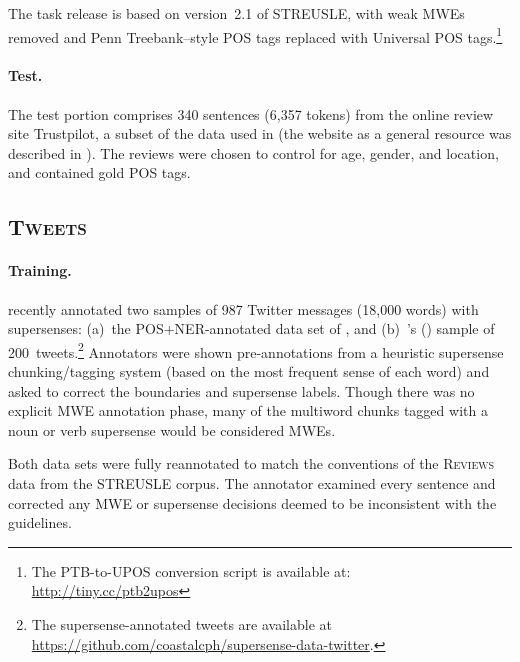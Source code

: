 \documentclass[11pt,letterpaper]{article}
\newcommand{\citeposs}[1]{\citeauthor{#1}'s (\citeyear{#1})}
\newcommand{\ensuretext}[1]{#1}
\newcommand{\nssmarker}{\ensuretext{\textcolor{magenta}{\ensuremath{^{\textsc{NS}}_{\textsc{S}}}}}}
\newcommand{\arkcomment}[3]{\ensuretext{\textcolor{#3}{[#1 #2]}}}
\newcommand{\nss}[1]{\arkcomment{\nssmarker}{#1}{magenta}}
\newcommand{\dataset}[1]{\mbox{\textsc{#1}}}	%
\newcommand{\finalversion}[1]{}
\newcommand{\longversion}[1]{#1} %
\begin{document}
The task release is based on version~2.1 of STREUSLE, with weak MWEs removed
and Penn Treebank--style POS tags replaced with Universal POS tags.\footnote{The PTB-to-UPOS conversion script is available at:
\mbox{\url{http://tiny.cc/ptb2upos}}} 


\paragraph{Test.}
The test portion comprises 340 sentences (6,357 tokens) from the online review site Trustpilot, a subset of the data used in \citet{hovy-2015age} 
(the website as a general resource was described in \citet{hovy-2015trustpilot}). 
The reviews were chosen to control for age, gender, and location, and contained gold POS tags. 
\finalversion{The data was further annotated for supersenses and MWE by \nss{?}.}

\subsection{\dataset{Tweets}}\label{sec:tweets} 
\paragraph{Training.}
\citet{johannsen-14} recently annotated two samples of 987 Twitter messages (18,000 words) 
with supersenses\longversion{: 
(a)~the POS+NER-annotated data set of \citet{ritter-11}, 
and 
(b)~\citeposs{plank-14} sample of 200~tweets}.\footnote{The supersense-annotated tweets 
are available at \url{https://github.com/coastalcph/supersense-data-twitter}.}
Annotators were shown pre-annotations from a heuristic supersense chunking\slash tagging system%
\longversion{ (based on the most frequent sense of each word)}
and asked to correct the boundaries and supersense labels. 
Though there was no explicit MWE annotation phase, 
many of the multiword chunks tagged with a \longversion{noun or verb }supersense would be considered MWEs.\finalversion{\nss{POS?}}

Both data sets were fully reannotated to match the conventions of the \dataset{Reviews} data from the STREUSLE corpus. 
The annotator examined every sentence and corrected any MWE or supersense decisions deemed to be inconsistent with the guidelines.\finalversion{\nss{TODO: how many changes were made??}}
\end{document}
